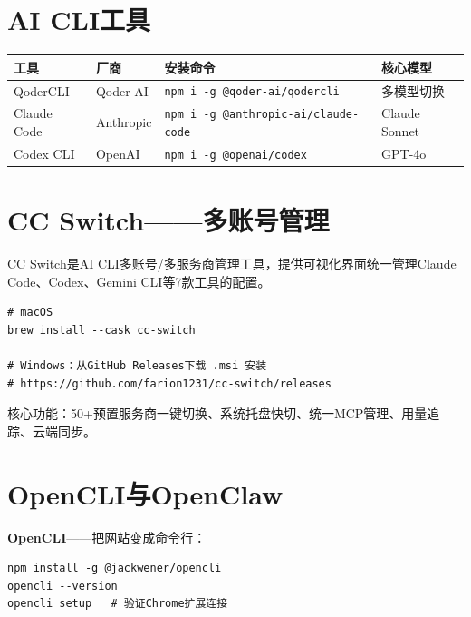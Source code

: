 \section{AI CLI工具}

\begin{table}[H]
\centering
\begin{tabular}{llll}
\toprule
\textbf{工具} & \textbf{厂商} & \textbf{安装命令} & \textbf{核心模型} \\
\midrule
QoderCLI & Qoder AI & \texttt{npm i -g @qoder-ai/qodercli} & 多模型切换 \\
Claude Code & Anthropic & \texttt{npm i -g @anthropic-ai/claude-code} & Claude Sonnet \\
Codex CLI & OpenAI & \texttt{npm i -g @openai/codex} & GPT-4o \\
\bottomrule
\end{tabular}
\end{table}

\section{CC Switch——多账号管理}

CC Switch是AI CLI多账号/多服务商管理工具，提供可视化界面统一管理Claude Code、Codex、Gemini CLI等7款工具的配置。

\begin{lstlisting}[style=shell]
# macOS
brew install --cask cc-switch

# Windows：从GitHub Releases下载 .msi 安装
# https://github.com/farion1231/cc-switch/releases
\end{lstlisting}

核心功能：50+预置服务商一键切换、系统托盘快切、统一MCP管理、用量追踪、云端同步。

\section{OpenCLI与OpenClaw}

\textbf{OpenCLI}——把网站变成命令行：

\begin{lstlisting}[style=shell]
npm install -g @jackwener/opencli
opencli --version
opencli setup   # 验证Chrome扩展连接
\end{lstlisting}

